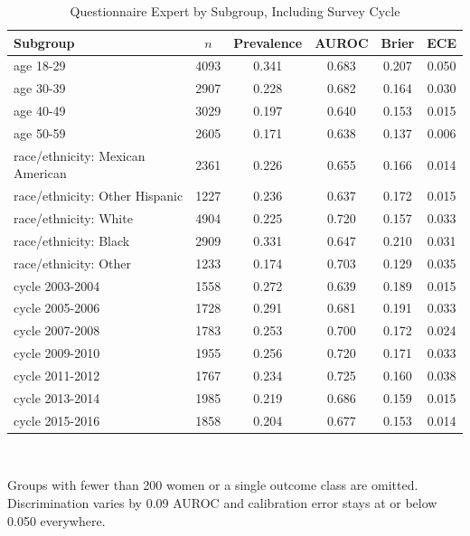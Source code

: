 \begin{table}[!htbp]
\caption{Questionnaire Expert by Subgroup, Including Survey Cycle}
\label{tab:ssubgroups}
\centering\footnotesize
\begin{tabular}{@{}lccccc@{}}
\toprule
Subgroup & $n$ & Prevalence & AUROC & Brier & ECE \\
\midrule
age 18-29 & 4093 & 0.341 & 0.683 & 0.207 & 0.050 \\
age 30-39 & 2907 & 0.228 & 0.682 & 0.164 & 0.030 \\
age 40-49 & 3029 & 0.197 & 0.640 & 0.153 & 0.015 \\
age 50-59 & 2605 & 0.171 & 0.638 & 0.137 & 0.006 \\
race/ethnicity: Mexican American & 2361 & 0.226 & 0.655 & 0.166 & 0.014 \\
race/ethnicity: Other Hispanic & 1227 & 0.236 & 0.637 & 0.172 & 0.015 \\
race/ethnicity: White & 4904 & 0.225 & 0.720 & 0.157 & 0.033 \\
race/ethnicity: Black & 2909 & 0.331 & 0.647 & 0.210 & 0.031 \\
race/ethnicity: Other & 1233 & 0.174 & 0.703 & 0.129 & 0.035 \\
cycle 2003-2004 & 1558 & 0.272 & 0.639 & 0.189 & 0.015 \\
cycle 2005-2006 & 1728 & 0.291 & 0.681 & 0.191 & 0.033 \\
cycle 2007-2008 & 1783 & 0.253 & 0.700 & 0.172 & 0.024 \\
cycle 2009-2010 & 1955 & 0.256 & 0.720 & 0.171 & 0.033 \\
cycle 2011-2012 & 1767 & 0.234 & 0.725 & 0.160 & 0.038 \\
cycle 2013-2014 & 1985 & 0.219 & 0.686 & 0.159 & 0.015 \\
cycle 2015-2016 & 1858 & 0.204 & 0.677 & 0.153 & 0.014 \\
\bottomrule
\end{tabular}
\\[2pt]\begin{minipage}{\textwidth}\scriptsize Groups with fewer than 200 women or a single outcome class are omitted. Discrimination varies by 0.09 AUROC and calibration error stays at or below 0.050 everywhere.\end{minipage}
\end{table}
